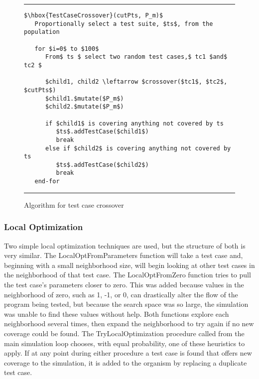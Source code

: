 \documentclass[runningheads]{llncs}
\begin{document}
\begin{figure}[h!]
	\begin{center}
		\hrule
		\medskip
		\begin{Verbatim}[fontfamily=tt, xleftmargin=10pt, commandchars=\\\{\},
		codes={\catcode`$=3\catcode`^=7\catcode`_=8}]
$\hbox{TestCaseCrossover}(cutPts, P_m)$  
   Proportionally select a test suite, $ts$, from the population

   for $i=0$ to $100$
      From$ ts $ select two random test cases,$ tc1 $and$ tc2 $

      $child1, child2 \leftarrow $crossover($tc1$, $tc2$, $cutPts$)
      $child1.$mutate($P_m$)
      $child2.$mutate($P_m$)

      if $child1$ is covering anything not covered by ts
         $ts$.addTestCase($child1$)
         break
      else if $child2$ is covering anything not covered by ts
         $ts$.addTestCase($child2$)
         break
   end-for
		\end{Verbatim}
		\hrule
	\end{center}
	\caption{Algorithm for test case crossover \label{fig:tcCross}}
\end{figure}

\FloatBarrier
\subsubsection{Local Optimization}

Two simple local optimization techniques are used, but the structure of both is very similar. The LocalOptFromParameters function will take a test case and, beginning with a small neighborhood size, will begin looking at other test cases in the neighborhood of that test case. The LocalOptFromZero function tries to pull the test case's parameters closer to zero. This was added because values in the neighborhood of zero, such as 1, -1, or 0, can drastically alter the flow of the program being tested, but because the search space was so large, the simulation was unable to find these values without help. Both functions explore each neighborhood several times, then expand the neighborhood to try again if no new coverage could be found. The TryLocalOptimization procedure called from the main simulation loop chooses, with equal probability, one of these heuristics to apply. If at any point during either procedure a test case is found that offers new coverage to the simulation, it is added to the organism by replacing a duplicate test case.
\end{document}
